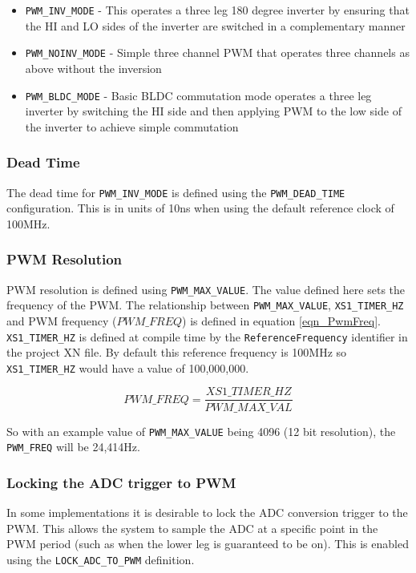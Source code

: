 \begin{itemize}
\item \verb=PWM_INV_MODE= - This operates a three leg 180 degree inverter by ensuring that the HI and LO sides of the inverter are switched in a complementary manner
\item \verb=PWM_NOINV_MODE= - Simple three channel PWM that operates three channels as above without the inversion
\item \verb=PWM_BLDC_MODE= - Basic BLDC commutation mode operates a three leg inverter by switching the HI side and then applying PWM to the low side of the inverter to achieve simple commutation
\end{itemize}

\subsubsection{Dead Time}
The dead time for \verb=PWM_INV_MODE= is defined using the \verb=PWM_DEAD_TIME= configuration. This is in units of 10ns when using the default reference clock of 100MHz.

\subsubsection{PWM Resolution}
PWM resolution is defined using \verb=PWM_MAX_VALUE=. The value defined here sets the frequency of the PWM. The relationship between \verb=PWM_MAX_VALUE=, \verb=XS1_TIMER_HZ= and PWM frequency ($PWM\_FREQ$) is defined in equation \ref{eqn_PwmFreq}. \verb=XS1_TIMER_HZ= is defined at compile time by the \verb=ReferenceFrequency= identifier in the project XN file. By default this reference frequency is 100MHz so \verb=XS1_TIMER_HZ= would have a value of 100,000,000.

\begin{equation}\label{eqn_PwmFreq}
PWM\_FREQ = \frac{XS1\_TIMER\_HZ}{PWM\_MAX\_VAL} 
\end{equation}

So with an example value of \verb=PWM_MAX_VALUE= being 4096 (12 bit resolution), the \verb=PWM_FREQ= will be 24,414Hz.

\subsubsection{Locking the ADC trigger to PWM}
In some implementations it is desirable to lock the ADC conversion trigger to the PWM. This allows the system to sample the ADC at a specific point in the PWM period (such as when the lower leg is guaranteed to be on). This is enabled using the \verb=LOCK_ADC_TO_PWM= definition.

